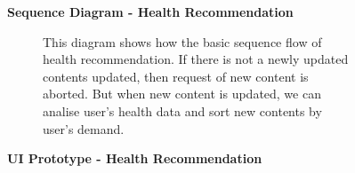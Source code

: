 \documentclass{article}
\begin{document}
		\begin{figure}[htbp]
			\textbf{Sequence Diagram - Health Recommendation}
			\centering
			\begin{subfigure}{\textwidth}
				\centering
				\scalebox{0.7}{}
			\end{subfigure}
			\begin{subfigure}{\textwidth}
				This diagram shows how the basic sequence flow of health recommendation. If there is not a newly updated contents updated, then request of new content is aborted. But when new content is updated, we can analise user's health data and sort new contents by user's demand.
			\end{subfigure}
		\end{figure}
		\clearpage

		\begin{figure}[htbp]
			\textbf{UI Prototype - Health Recommendation}
			\centering
			\begin{subfigure}{\textwidth}
				\resizebox{\textwidth}{!}{}
			\end{subfigure}
			\begin{subfigure}{\textwidth}
			
			\end{subfigure}
		\end{figure}
		\clearpage
		
		
\end{document}
